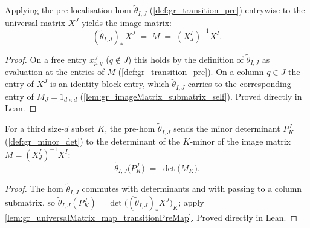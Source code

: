 \begin{lemma}

  \label{lem:gr_universalMatrix_map_transitionPreMap}
  Applying the pre-localisation hom \(\tilde\theta_{I,J}\)
  (\cref{def:gr_transition_pre}) entrywise to the universal matrix \(X^J\) yields
  the image matrix:
  \[
    (\tilde\theta_{I,J})_\ast\, X^J \;=\; M \;=\; (X^I_J)^{-1} X^I .
  \]
\end{lemma}
\begin{proof}

\leanok
  On a free entry \(x^J_{p,q}\) (\(q \notin J\)) this holds by the definition of
  \(\tilde\theta_{I,J}\) as evaluation at the entries of \(M\)
  (\cref{def:gr_transition_pre}). On a column \(q \in J\) the entry of \(X^J\) is
  an identity-block entry, which \(\tilde\theta_{I,J}\) carries to the
  corresponding entry of \(M_J = 1_{d\times d}\)
  (\cref{lem:gr_imageMatrix_submatrix_self}). Proved directly in Lean.
\end{proof}

\begin{lemma}

  \label{lem:gr_transitionPreMap_minorDet}
  For a third size-\(d\) subset \(K\), the pre-hom \(\tilde\theta_{I,J}\) sends the
  minor determinant \(P^J_K\) (\cref{def:gr_minor_det}) to the determinant of the
  \(K\)-minor of the image matrix \(M = (X^I_J)^{-1} X^I\):
  \[
    \tilde\theta_{I,J}\bigl(P^J_K\bigr) \;=\; \det\bigl(M_K\bigr).
  \]
\end{lemma}
\begin{proof}

\leanok
  The hom \(\tilde\theta_{I,J}\) commutes with determinants and with passing to
  a column submatrix, so \(\tilde\theta_{I,J}(P^J_K) =
  \det\bigl((\tilde\theta_{I,J})_\ast X^J\bigr)_K\); apply
  \cref{lem:gr_universalMatrix_map_transitionPreMap}. Proved directly in Lean.
\end{proof}

